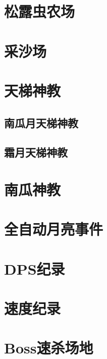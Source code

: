 \section{松露虫农场}

\section{采沙场}

\section{天梯神教}
\subsection{南瓜月天梯神教}
\subsection{霜月天梯神教}

\section{南瓜神教}

\section{全自动月亮事件}

\section{DPS纪录}

\section{速度纪录}

\section{Boss速杀场地}
